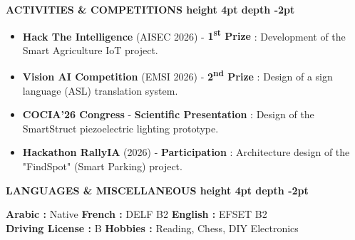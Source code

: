 \documentclass[10pt,a4paper]{altacv}
\renewcommand{\cvsection}[2][]{%
  \vspace{3pt}%
  {\color{heading}\LARGE\bfseries #2 \hspace{0.2em}\leaders\vrule height 4pt depth -2pt\hfill\mbox{}}\par\vspace{2pt}
}
\begin{document}
\cvsection{ACTIVITIES \& COMPETITIONS}
\begin{itemize}[leftmargin=*, label=\textbullet, itemsep=2pt]
  \item \textbf{Hack The Intelligence} (AISEC 2026) - \textbf{1\textsuperscript{st} Prize} : {\small Development of the Smart Agriculture IoT project.}
  \item \textbf{Vision AI Competition} (EMSI 2026) - \textbf{2\textsuperscript{nd} Prize} : {\small Design of a sign language (ASL) translation system.}
  \item \textbf{COCIA'26 Congress} - \textbf{Scientific Presentation} : {\small Design of the SmartStruct piezoelectric lighting prototype.}
  \item \textbf{Hackathon RallyIA} (2026) - \textbf{Participation} : {\small Architecture design of the "FindSpot" (Smart Parking) project.}
\end{itemize}


\cvsection{LANGUAGES \& MISCELLANEOUS}
\textbf{Arabic :} Native \hfill \textbf{French :} DELF B2 \hfill \textbf{English :} EFSET B2\\[2pt]
\textbf{Driving License :} B \hfill \textbf{Hobbies :} Reading, Chess, DIY Electronics
\end{document}
